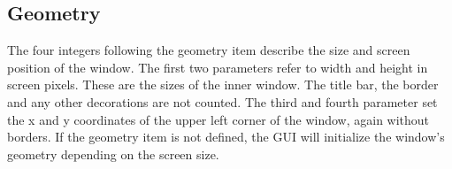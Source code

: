 \subsection{Geometry}
The four integers following the geometry item describe
the size and screen position of the window.
The first two parameters refer to width and height in 
screen pixels. These are the sizes of the inner window.
The title bar, the border and any other decorations are not counted.
The third and fourth parameter set the x and y coordinates of the
upper left corner of the window, again without borders.
If the geometry item is not defined, the GUI will
initialize the window's geometry depending on the screen size.


